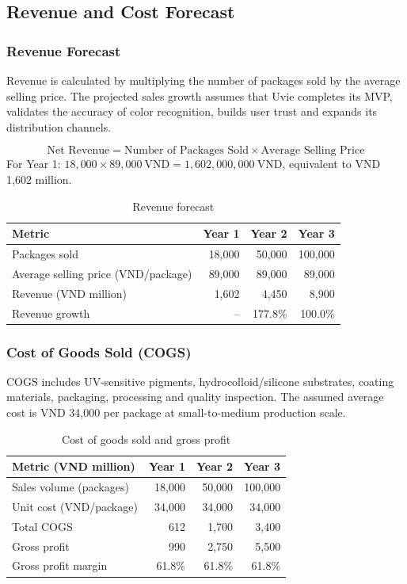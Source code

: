 \subsection{Revenue and Cost Forecast}

\subsubsection{Revenue Forecast}
Revenue is calculated by multiplying the number of packages sold by the average
selling price. The projected sales growth assumes that Uvie completes its MVP,
validates the accuracy of color recognition, builds user trust and expands its
distribution channels.

\[
  \text{Net Revenue} = \text{Number of Packages Sold} \times \text{Average Selling Price}
\]
For Year 1: $18{,}000 \times 89{,}000\ \text{VND} = 1{,}602{,}000{,}000\ \text{VND}$,
equivalent to VND 1,602 million.

\begin{table}[ht]
\centering\small
\caption{Revenue forecast}\label{tab:revenue}
\begin{tabular}{@{}L{6.2cm}rrr@{}}
  \toprule
  \textbf{Metric} & \textbf{Year 1} & \textbf{Year 2} & \textbf{Year 3}\\
  \midrule
  Packages sold & 18,000 & 50,000 & 100,000\\
  Average selling price (VND/package) & 89,000 & 89,000 & 89,000\\
  Revenue (VND million) & 1,602 & 4,450 & 8,900\\
  Revenue growth & -- & 177.8\% & 100.0\%\\
  \bottomrule
\end{tabular}
\end{table}

\subsubsection{Cost of Goods Sold (COGS)}
COGS includes UV-sensitive pigments, hydrocolloid/silicone substrates, coating
materials, packaging, processing and quality inspection. The assumed average cost
is VND 34,000 per package at small-to-medium production scale.

\begin{table}[ht]
\centering\small
\caption{Cost of goods sold and gross profit}\label{tab:cogs}
\begin{tabular}{@{}L{6.2cm}rrr@{}}
  \toprule
  \textbf{Metric (VND million)} & \textbf{Year 1} & \textbf{Year 2} & \textbf{Year 3}\\
  \midrule
  Sales volume (packages) & 18,000 & 50,000 & 100,000\\
  Unit cost (VND/package) & 34,000 & 34,000 & 34,000\\
  Total COGS & 612 & 1,700 & 3,400\\
  Gross profit & 990 & 2,750 & 5,500\\
  Gross profit margin & 61.8\% & 61.8\% & 61.8\%\\
  \bottomrule
\end{tabular}
\end{table}

